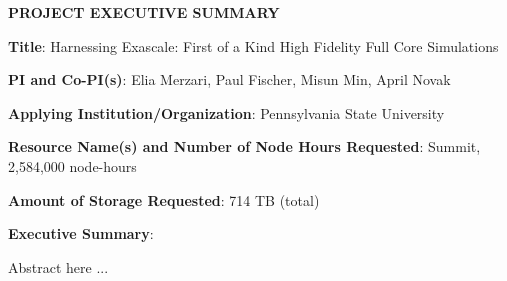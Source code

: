 \documentclass[11pt,letterpaper,english]{article}
\begin{document}
\setlength{\parindent}{0in} %

\pagestyle{fancy}   \renewcommand{%
\headrulewidth}{0.0pt}

\begin{center}
\bf {PROJECT EXECUTIVE SUMMARY} \\
\end{center}



\bigskip

\textbf{Title}: Harnessing Exascale: First of a Kind High Fidelity Full Core Simulations \smallskip

\textbf{PI and Co-PI(s)}: Elia Merzari, Paul Fischer, Misun Min, April Novak \smallskip

\textbf{Applying Institution/Organization}: Pennsylvania State University \smallskip

\textbf{Resource Name(s) and Number of Node Hours Requested}: Summit, 2,584,000 node-hours \smallskip

\textbf{Amount of Storage Requested}: 714 TB (total) \smallskip

\textbf{Executive Summary}: \\

\vspace{.15in}

Abstract here ...

\end{document}
